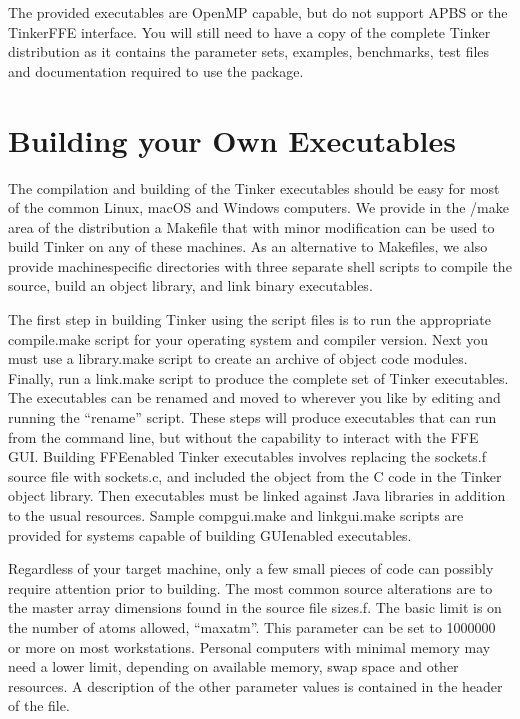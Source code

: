 \documentclass[letterpaper,11pt,english]{sphinxmanual}
\begin{document}
\sphinxAtStartPar
The provided executables are OpenMP capable, but do not support APBS or the Tinker\sphinxhyphen{}FFE interface. You will still need to have a copy of the complete Tinker distribution as it contains the parameter sets, examples, benchmarks, test files and documentation required to use the package.


\section{Building your Own Executables}
\label{\detokenize{text/installation:building-your-own-executables}}
\sphinxAtStartPar
The compilation and building of the Tinker executables should be easy for most of the common Linux, macOS and Windows computers. We provide in the /make area of the distribution a Makefile that with minor modification can be used to build Tinker on any of these machines. As an alternative to Makefiles, we also provide machine\sphinxhyphen{}specific directories with three separate shell scripts to compile the source, build an object library, and link binary executables.

\sphinxAtStartPar
The first step in building Tinker using the script files is to run the appropriate compile.make script for your operating system and compiler version. Next you must use a library.make script to create an archive of object code modules. Finally, run a link.make script to produce the complete set of Tinker executables. The executables can be renamed and moved to wherever you like by editing and running the “rename” script. These steps will produce executables that can run from the command line, but without the capability to interact with the FFE GUI. Building FFE\sphinxhyphen{}enabled Tinker executables involves replacing the sockets.f source file with sockets.c, and included the object from the C code in the Tinker object library. Then executables must be linked against Java libraries in addition to the usual resources. Sample compgui.make and linkgui.make scripts are provided for systems capable of building GUI\sphinxhyphen{}enabled executables.

\sphinxAtStartPar
Regardless of your target machine, only a few small pieces of code can possibly require attention prior to building. The most common source alterations are to the master array dimensions found in the source file sizes.f. The basic limit is on the number of atoms allowed, “maxatm”. This parameter can be set to 1000000 or more on most workstations. Personal computers with minimal memory may need a lower limit, depending on available memory, swap space and other resources. A description of the other parameter values is contained in the header of the file.
\end{document}
